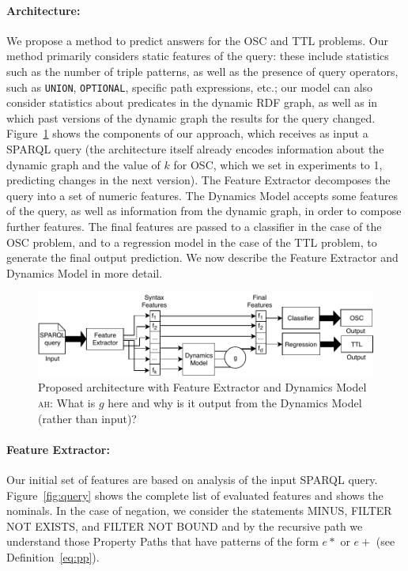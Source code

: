 \documentclass[runningheads]{llncs}
\newcommand{\ah}[1]{{\color{blue}\textsc{ah:} #1}}
\begin{document}
\paragraph{Architecture:} We propose a method to predict answers for the OSC and TTL problems. Our method primarily considers static features of the query: these include statistics such as the number of triple patterns, as well as the presence of query operators, such as \texttt{UNION}, \texttt{OPTIONAL}, specific path expressions, etc.; our model can also consider statistics about predicates in the dynamic RDF graph, as well as in which past versions of the dynamic graph the results for the query changed. Figure~\ref{fig:schema} shows the components of our approach, which receives as input a SPARQL query (the architecture itself already encodes information about the dynamic graph and the value of $k$ for OSC, which we set in experiments to 1, predicting changes in the next version). The Feature Extractor decomposes the query into a set of numeric features. The Dynamics Model accepts some features of the query, as well as information from the dynamic graph, in order to compose further features. The final features are passed to a classifier in the case of the OSC problem, and to a regression model in the case of the TTL problem, to generate the final output prediction. We now describe the Feature Extractor and Dynamics Model in more detail.

\begin{figure}[!t]
	\centering
	\includegraphics[width=0.9\linewidth]{img/schema.pdf}
	\caption{Proposed architecture with Feature Extractor and Dynamics Model \ah{What is $g$ here and why is it output from the Dynamics Model (rather than input)?}}
	\label{fig:schema}
\end{figure}

\paragraph{Feature Extractor:} Our initial set of features are based on analysis of the input SPARQL query. Figure~\ref{fig:query} shows the complete list of evaluated features and shows the nominals. In the case of negation, we consider the statements MINUS, FILTER NOT EXISTS, and FILTER NOT BOUND and by the recursive path we understand those Property Paths that have patterns of the form $e*$ or $e+$ (see Definition~\ref{eq:pp}).
\end{document}

